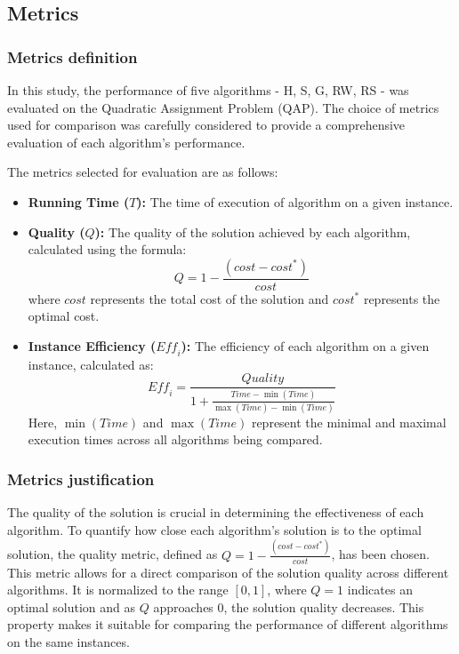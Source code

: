 \subsection{Metrics}\label{subsec:metrics}
\subsubsection{Metrics definition}\label{subsubsec:metrics-definition}

In this study, the performance of five algorithms - H, S, G, RW, RS - was evaluated on the Quadratic Assignment Problem (QAP).
The choice of metrics used for comparison was carefully considered to provide a comprehensive evaluation of each algorithm's performance.

The metrics selected for evaluation are as follows:

\begin{itemize}
    \item \textbf{Running Time ($T$):} The time of execution of algorithm on a given instance.
    \item \textbf{Quality ($Q$):} The quality of the solution achieved by each algorithm, calculated using the formula:
    \[ Q = 1 - \frac{(cost - cost^{*})}{cost} \]
    where $cost$ represents the total cost of the solution and $cost^{*}$ represents the optimal cost.
    \item \textbf{Instance Efficiency ($\textit{Eff}_i$):} The efficiency of each algorithm on a given instance, calculated as:
    \[ \textit{Eff}_i = \frac{Quality}{1 + \frac{Time - \min(Time)}{\max(Time) - \min(Time)}} \]
    Here, $\min(Time)$ and $\max(Time)$ represent the minimal and maximal execution times across all algorithms being compared.
\end{itemize}


\subsubsection{Metrics justification}\label{subsubsec:metrics-justification}

The quality of the solution is crucial in determining the effectiveness of each algorithm.
To quantify how close each algorithm's solution is to the optimal solution, the quality metric, defined as $Q = 1 - \frac{(cost - cost^{*})}{cost}$, has been chosen.
This metric allows for a direct comparison of the solution quality across different algorithms.
It is normalized to the range $[0, 1]$,
where $Q = 1$ indicates an optimal solution and as $Q$ approaches $0$, the solution quality decreases.
This property makes it suitable for comparing the performance of different algorithms on the same instances.

